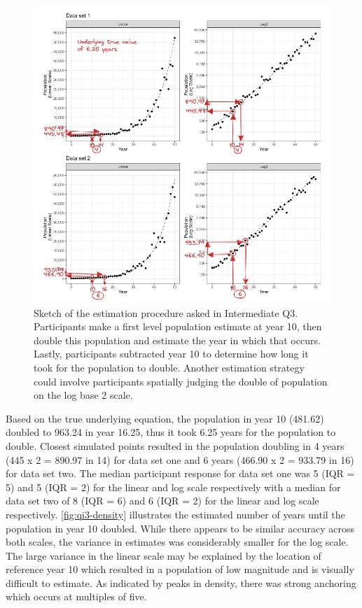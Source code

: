 \documentclass[print]{nuthesis}
\begin{document}
\begin{figure}[tbp]

{\centering \includegraphics[width=1\linewidth,]{images/03-estimation/qi3-sketch} 

}

\caption[Intermediate Q3 sketch]{Sketch of the estimation procedure asked in Intermediate Q3. Participants make a first level population estimate at year 10, then double this population and estimate the year in which that occurs. Lastly, participants subtracted year 10 to determine how long it took for the population to double. Another estimation strategy could involve participants spatially judging the double of population on the log base 2 scale.}\label{fig:qi3-sketch}
\end{figure}

Based on the true underlying equation, the population in year 10 (481.62) doubled to 963.24 in year 16.25, thus it took 6.25 years for the population to double.
Closest simulated points resulted in the population doubling in 4 years (445 x 2 = 890.97 in 14) for data set one and 6 years (466.90 x 2 = 933.79 in 16) for data set two.
The median participant response for data set one was 5 (IQR = 5) and 5 (IQR = 2) for the linear and log scale respectively with a median for data set two of 8 (IQR = 6) and 6 (IQR = 2) for the linear and log scale respectively.
\cref{fig:qi3-density} illustrates the estimated number of years until the population in year 10 doubled.
While there appears to be similar accuracy across both scales, the variance in estimates was considerably smaller for the log scale.
The large variance in the linear scale may be explained by the location of reference year 10 which resulted in a population of low magnitude and is visually difficult to estimate.
As indicated by peaks in density, there was strong anchoring which occurs at multiples of five.
\end{document}

